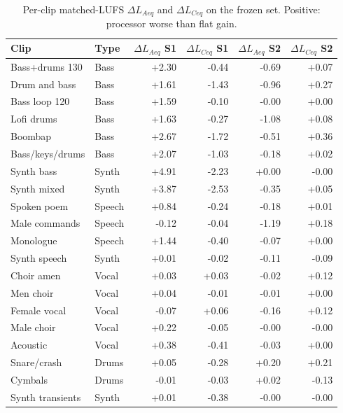 \begin{table}[!htbp]
\centering
\caption{Per-clip matched-LUFS $\Delta L_{Aeq}$ and $\Delta L_{Ceq}$ on the frozen set. Positive: processor worse than flat gain.}
\label{tab:cweightclips}
\renewcommand{\arraystretch}{1.08}
\begin{tabular}{l l r r r r}
\hline
Clip & Type & $\Delta L_{Aeq}$ S1 & $\Delta L_{Ceq}$ S1 & $\Delta L_{Aeq}$ S2 & $\Delta L_{Ceq}$ S2 \\
\hline
Bass+drums 130 & Bass & +2.30 & -0.44 & -0.69 & +0.07 \\
Drum and bass & Bass & +1.61 & -1.43 & -0.96 & +0.27 \\
Bass loop 120 & Bass & +1.59 & -0.10 & -0.00 & +0.00 \\
Lofi drums & Bass & +1.63 & -0.27 & -1.08 & +0.08 \\
Boombap & Bass & +2.67 & -1.72 & -0.51 & +0.36 \\
Bass/keys/drums & Bass & +2.07 & -1.03 & -0.18 & +0.02 \\
Synth bass & Synth & +4.91 & -2.23 & +0.00 & -0.00 \\
Synth mixed & Synth & +3.87 & -2.53 & -0.35 & +0.05 \\
Spoken poem & Speech & +0.84 & -0.24 & -0.18 & +0.01 \\
Male commands & Speech & -0.12 & -0.04 & -1.19 & +0.18 \\
Monologue & Speech & +1.44 & -0.40 & -0.07 & +0.00 \\
Synth speech & Synth & +0.01 & -0.02 & -0.11 & -0.09 \\
Choir amen & Vocal & +0.03 & +0.03 & -0.02 & +0.12 \\
Men choir & Vocal & +0.04 & -0.01 & -0.01 & +0.00 \\
Female vocal & Vocal & -0.07 & +0.06 & -0.16 & +0.12 \\
Male choir & Vocal & +0.22 & -0.05 & -0.00 & -0.00 \\
Acoustic & Vocal & +0.38 & -0.41 & -0.03 & +0.00 \\
Snare/crash & Drums & +0.05 & -0.28 & +0.20 & +0.21 \\
Cymbals & Drums & -0.01 & -0.03 & +0.02 & -0.13 \\
Synth transients & Synth & +0.01 & -0.38 & -0.00 & -0.00 \\
\hline
\end{tabular}
\end{table}
